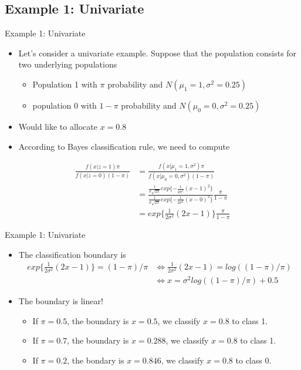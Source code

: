 \documentclass[
  ignorenonframetext,
]{beamer}
\providecommand{\tightlist}{%
  \setlength{\itemsep}{0pt}\setlength{\parskip}{0pt}}
\begin{document}
\hypertarget{example-1-univariate}{%
\subsection{Example 1: Univariate}\label{example-1-univariate}}

\begin{frame}{Example 1: Univariate}
\begin{itemize}
\tightlist
\item
  Let's consider a univariate example. Suppose that the population
  consists for two underlying populations

  \begin{itemize}
  \tightlist
  \item
    Population 1 with \(\pi\) probability and
    \(N(\mu_1=1, \sigma^2=0.25)\)
  \item
    population 0 with \(1-\pi\) probability and
    \(N(\mu_0=0, \sigma^2=0.25)\)
  \end{itemize}
\item
  Would like to allocate \(x=0.8\)
\item
  According to Bayes classification rule, we need to compute
\end{itemize}

\[\begin{aligned}
\frac{f(x|z=1)\pi}{f(x|z=0)(1-\pi)} &=\frac{f(x|\mu_1=1,\sigma^2)\pi}{f(x|\mu_0=0, \sigma^2)(1-\pi)}\\
&=\frac{\frac{1}{\sigma\sqrt{2\pi}}exp\{-\frac{1}{2\sigma^2}(x-1)^2\}}
{\frac{1}{\sigma\sqrt{2\pi}}exp\{-\frac{1}{2\sigma^2}(x-0)^2\}}\frac{\pi}{1-\pi}\\
&= exp\{\frac{1}{2\sigma^2} (2x-1) \}\frac{\pi}{1-\pi}
\end{aligned}\]
\end{frame}

\begin{frame}{Example 1: Univariate}
\protect\hypertarget{example-1-univariate-1}{}
\begin{itemize}
\item
  The classification boundary is \[\begin{aligned}
  exp\{\frac{1}{2\sigma^2} (2x-1) \} =(1-\pi)/\pi &\Leftrightarrow \frac{1}{2\sigma^2} (2x-1)=log((1-\pi)/\pi)\\
  &\Leftrightarrow x=\sigma^2 log((1-\pi)/\pi)+0.5
  \end{aligned}\]
\item
  The boundary is linear!

  \begin{itemize}
  \tightlist
  \item
    If \(\pi=0.5\), the boundary is \(x=0.5\), we classify \(x=0.8\) to
    class 1.
  \item
    If \(\pi=0.7\), the boundary is \(x=0.288\), we classify \(x=0.8\)
    to class 1.
  \item
    If \(\pi=0.2\), the bondary is \(x=0.846\), we classify \(x=0.8\) to
    class 0.
  \end{itemize}
\end{itemize}
\end{frame}
\end{document}
